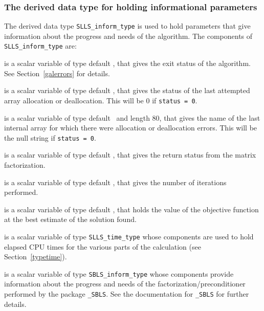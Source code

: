 \documentclass{galahad}
\newcommand{\packagename}{SLLS}
\begin{document}
\subsubsection{The derived data type for holding informational
 parameters}\label{typeinform}
The derived data type
{\tt \packagename\_inform\_type}
is used to hold parameters that give information about the progress and needs
of the algorithm. The components of
{\tt \packagename\_inform\_type}
are:

\begin{description}

 is a scalar variable of type default \integer, that gives the
exit status of the algorithm.
See Section~\ref{galerrors}
for details.

 is a scalar variable of type default \integer, that gives
the status of the last attempted array allocation or deallocation.
This will be 0 if {\tt status = 0}.

 is a scalar variable of type default \character\
and length 80, that  gives the name of the last internal array
for which there were allocation or deallocation errors.
This will be the null string if {\tt status = 0}.

 is a scalar variable of type default \integer, that
gives the return status from the matrix factorization.

 is a scalar variable of type default \integer, that
gives the number of iterations performed.

 is a scalar variable of type default \realdp, that holds the
value of the objective function at the best estimate of the solution found.

 is a scalar variable of type {\tt \packagename\_time\_type}
whose components are used to hold elapsed CPU times for the various parts
of the calculation (see Section~\ref{typetime}).

 is a scalar variable of type
{\tt SBLS\_inform\_type} %
whose components provide information about the progress and needs
of the factorization/preconditioner
performed by the package
{\tt \libraryname\_SBLS}.
See the documentation for {\tt \libraryname\_SBLS} for further details.

\end{description}

\end{document}
